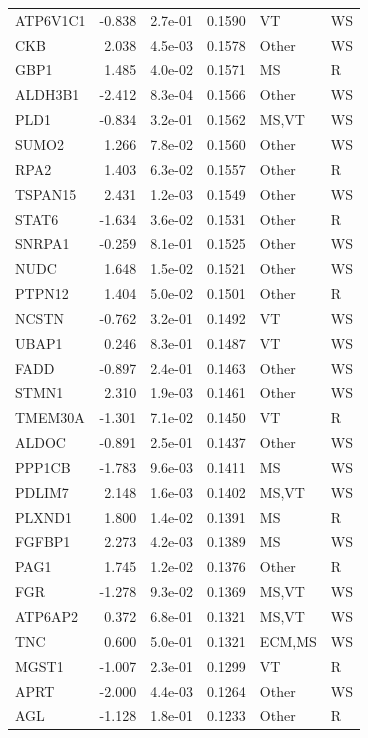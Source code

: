 \begin{table}[ht]
\begin{tabular}{lrlrll}
  ATP6V1C1 & -0.838 & 2.7e-01 & 0.1590 & VT & WS \\ 
  CKB & 2.038 & 4.5e-03 & 0.1578 & Other & WS \\ 
  GBP1 & 1.485 & 4.0e-02 & 0.1571 & MS & R \\ 
  ALDH3B1 & -2.412 & 8.3e-04 & 0.1566 & Other & WS \\ 
  PLD1 & -0.834 & 3.2e-01 & 0.1562 & MS,VT & WS \\ 
  SUMO2 & 1.266 & 7.8e-02 & 0.1560 & Other & WS \\ 
  RPA2 & 1.403 & 6.3e-02 & 0.1557 & Other & R \\ 
  TSPAN15 & 2.431 & 1.2e-03 & 0.1549 & Other & WS \\ 
  STAT6 & -1.634 & 3.6e-02 & 0.1531 & Other & R \\ 
  SNRPA1 & -0.259 & 8.1e-01 & 0.1525 & Other & WS \\ 
  NUDC & 1.648 & 1.5e-02 & 0.1521 & Other & WS \\ 
  PTPN12 & 1.404 & 5.0e-02 & 0.1501 & Other & R \\ 
  NCSTN & -0.762 & 3.2e-01 & 0.1492 & VT & WS \\ 
  UBAP1 & 0.246 & 8.3e-01 & 0.1487 & VT & WS \\ 
  FADD & -0.897 & 2.4e-01 & 0.1463 & Other & WS \\ 
  STMN1 & 2.310 & 1.9e-03 & 0.1461 & Other & WS \\ 
  TMEM30A & -1.301 & 7.1e-02 & 0.1450 & VT & R \\ 
  ALDOC & -0.891 & 2.5e-01 & 0.1437 & Other & WS \\ 
  PPP1CB & -1.783 & 9.6e-03 & 0.1411 & MS & WS \\ 
  PDLIM7 & 2.148 & 1.6e-03 & 0.1402 & MS,VT & WS \\ 
  PLXND1 & 1.800 & 1.4e-02 & 0.1391 & MS & R \\ 
  FGFBP1 & 2.273 & 4.2e-03 & 0.1389 & MS & WS \\ 
  PAG1 & 1.745 & 1.2e-02 & 0.1376 & Other & R \\ 
  FGR & -1.278 & 9.3e-02 & 0.1369 & MS,VT & WS \\ 
  ATP6AP2 & 0.372 & 6.8e-01 & 0.1321 & MS,VT & WS \\ 
  TNC & 0.600 & 5.0e-01 & 0.1321 & ECM,MS & WS \\ 
  MGST1 & -1.007 & 2.3e-01 & 0.1299 & VT & R \\ 
  APRT & -2.000 & 4.4e-03 & 0.1264 & Other & WS \\ 
  AGL & -1.128 & 1.8e-01 & 0.1233 & Other & R \\ 

\end{tabular}
\end{table}
